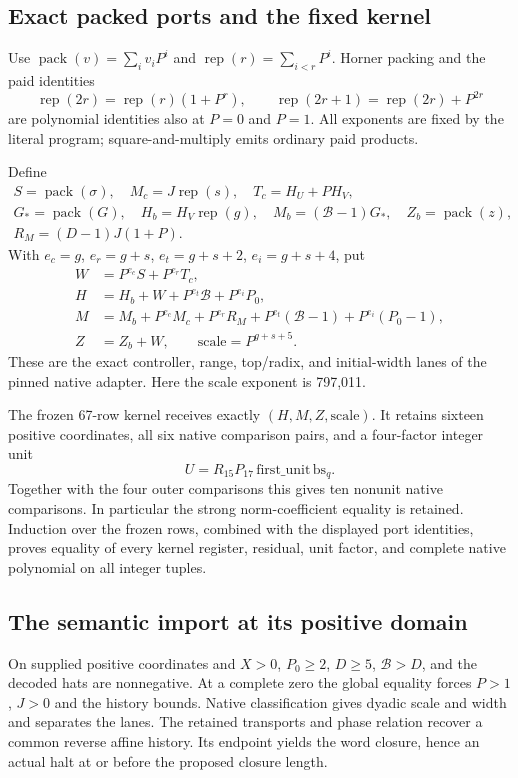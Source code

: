 \documentclass[11pt,letterpaper]{article}
\theoremstyle{definition}\newtheorem{definition}[theorem]{Definition}
\theoremstyle{remark}\newtheorem{remark}[theorem]{Remark}
\newcommand{\rep}{\operatorname{rep}}
\newcommand{\pack}{\operatorname{pack}}
\begin{document}
\subsection{Exact packed ports and the fixed kernel}
Use $\pack(v)=\sum_i v_iP^i$ and $\rep(r)=\sum_{i<r}P^i$. Horner packing and the paid identities
\[
 \rep(2r)=\rep(r)(1+P^r),\qquad
 \rep(2r+1)=\rep(2r)+P^{2r}
\]
are polynomial identities also at $P=0$ and $P=1$. All exponents are fixed by the literal program; square-and-multiply emits ordinary paid products.

Define
\begin{gather*}
 S=\pack(\sigma),\quad M_c=J\rep(s),\quad T_c=H_U+PH_V,\\
 G_*=\pack(G),\quad H_b=H_V\rep(g),\quad
 M_b=(\mathcal B-1)G_*,\quad Z_b=\pack(z),\\
 R_M=(D-1)J(1+P).
\end{gather*}
With $e_c=g$, $e_r=g+s$, $e_t=g+s+2$, $e_i=g+s+4$, put
\begin{align*}
 W&=P^{e_c}S+P^{e_r}T_c,\\
 H&=H_b+W+P^{e_t}\mathcal B+P^{e_i}P_0,\\
 M&=M_b+P^{e_c}M_c+P^{e_r}R_M
            +P^{e_t}(\mathcal B-1)+P^{e_i}(P_0-1),\\
 Z&=Z_b+W,\qquad \mathrm{scale}=P^{g+s+5}.
\end{align*}
These are the exact controller, range, top/radix, and initial-width lanes of the pinned native adapter. Here the scale exponent is 797,011.

The frozen 67-row kernel receives exactly $(H,M,Z,\mathrm{scale})$. It retains sixteen positive coordinates, all six native comparison pairs, and a four-factor integer unit
\[
 U=R_{15}P_{17}\,\mathrm{first\_unit}\,\mathrm{bs}_q.
\]
Together with the four outer comparisons this gives ten nonunit native comparisons. In particular the strong norm-coefficient equality is retained. Induction over the frozen rows, combined with the displayed port identities, proves equality of every kernel register, residual, unit factor, and complete native polynomial on all integer tuples.

\subsection{The semantic import at its positive domain}
On supplied positive coordinates and $X>0$, $P_0\ge2$, $D\ge5$, $\mathcal B>D$, and the decoded hats are nonnegative. At a complete zero the global equality forces $P>1$, $J>0$ and the history bounds. Native classification gives dyadic scale and width and separates the lanes. The retained transports and phase relation recover a common reverse affine history. Its endpoint yields the word closure, hence an actual halt at or before the proposed closure length.
\end{document}
